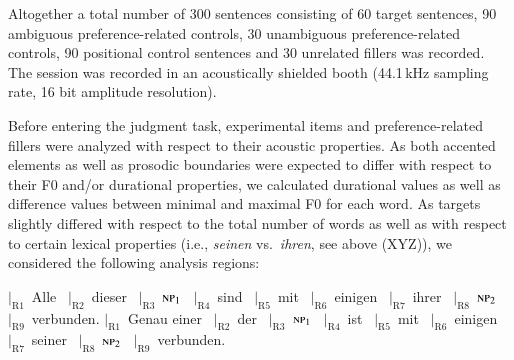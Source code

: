 \documentclass[fleqn,reqno,10pt,draft]{article}
\begin{document}
Altogether a total number of 300 sentences consisting of 60 target sentences, 90 ambiguous preference-related controls, 30 unambiguous preference-related controls, 90 positional control sentences and 30 unrelated fillers was recorded. The session was recorded in an acoustically
shielded booth (44.1\,kHz sampling rate, 16 bit amplitude resolution).

Before entering the judgment task, experimental items and
preference-related fillers were analyzed with respect to their acoustic
properties. As both accented elements as well as prosodic boundaries
were expected to differ with respect to their F0 and/or durational
properties, we calculated durational values as well as difference
values between minimal and maximal F0 for each word. As targets
slightly differed with respect to the total number of words as well as
with respect to certain lexical properties (i.e., \emph{seinen}
vs.~\emph{ihren}, see above (XYZ)), we considered
the following analysis regions:

\begin{exe}
  \ex
    \begin{xlist}
      \ex $|_{\text{R}1}$~Alle  	\ $|_{\text{R}2}$~dieser 
      \ $|_{\text{R}3}$~$\textsc{np}_1$  
      \ $|_{\text{R}4}$~sind  \ $|_{\text{R}5}$~mit  \
      $|_{\text{R}6}$~einigen  \ $|_{\text{R}7}$~ihrer 
       \ $|_{\text{R}8}$~{$\textsc{np}_2$}  \ $|_{\text{R}9}$~verbunden.
    \ex       $|_{\text{R}1}$~Genau einer  	\ $|_{\text{R}2}$~der 
      \ $|_{\text{R}3}$~$\textsc{np}_1$  
      \ $|_{\text{R}4}$~ist  \ $|_{\text{R}5}$~mit  \
      $|_{\text{R}6}$~einigen  \ $|_{\text{R}7}$~seiner 
       \ $|_{\text{R}8}$~{$\textsc{np}_2$}  \ $|_{\text{R}9}$~verbunden.
    \end{xlist}
\end{exe}
\end{document}
